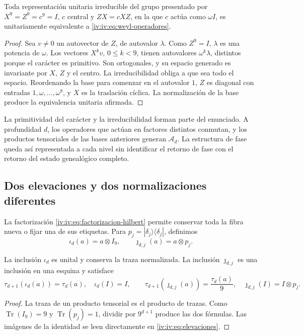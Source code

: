 \begin{theorem}
\label{iv:iv:thm:weyl-unicidad}
Toda representación unitaria irreducible del grupo presentado por
\(X^9=Z^9=c^9=I\), \(c\) central y \(ZX=cXZ\), en la que
\(c\) actúa como \(\omega I\), es unitariamente equivalente a
\eqref{iv:iv:eq:weyl-operadores}.
\end{theorem}
\begin{proof}
Sea \(v\neq0\) un autovector de \(Z\), de autovalor \(\lambda\).
Como \(Z^9=I\), \(\lambda\) es una potencia de \(\omega\).
Los vectores \(X^kv\), \(0\leq k<9\), tienen autovalores
\(\omega^k\lambda\), distintos porque el carácter es primitivo.
Son ortogonales, y su espacio generado es invariante por \(X\),
\(Z\) y el centro. La irreducibilidad obliga a que sea todo el
espacio. Reordenando la base para comenzar en el autovalor \(1\),
\(Z\) es diagonal con entradas \(1,\omega,\ldots,\omega^8\),
y \(X\) es la traslación cíclica. La normalización de la base
produce la equivalencia unitaria afirmada.
\end{proof}

La primitividad del carácter y la irreducibilidad forman parte del
enunciado. A profundidad \(d\), los operadores que actúan en factores
distintos conmutan, y los productos tensoriales de las bases anteriores
generan \(\mathcal A_d\). La estructura de fase queda así
representada a cada nivel sin identificar el retorno de fase con el
retorno del estado genealógico completo.

\subsection{Dos elevaciones y dos normalizaciones diferentes}

La factorización \eqref{iv:iv:eq:factorizacion-hilbert} permite conservar
toda la fibra nueva o fijar una de sus etiquetas. Para
\(p_j=|\delta_j\rangle\langle\delta_j|\), definimos
\begin{equation}
 \iota_d(a)=a\otimes I_9,
 \qquad \jmath_{d,j}(a)=a\otimes p_j.
 \label{iv:iv:eq:elevaciones}
\end{equation}
\begin{proposition}
\label{iv:iv:prop:unidad-traza}
La inclusión \(\iota_d\) es unital y conserva la traza normalizada.
La inclusión \(\jmath_{d,j}\) es una inclusión en una esquina y
satisface
\[
 \tau_{d+1}(\iota_d(a))=\tau_d(a),\quad \iota_d(I)=I,
 \qquad
 \tau_{d+1}(\jmath_{d,j}(a))=\frac{\tau_d(a)}9,
 \quad \jmath_{d,j}(I)=I\otimes p_j.
\]
\end{proposition}
\begin{proof}
La traza de un producto tensorial es el producto de trazas.
Como \(\operatorname{Tr}(I_9)=9\) y
\(\operatorname{Tr}(p_j)=1\), dividir por \(9^{d+1}\)
produce las dos fórmulas. Las imágenes de la identidad se leen
directamente en \eqref{iv:iv:eq:elevaciones}.
\end{proof}

